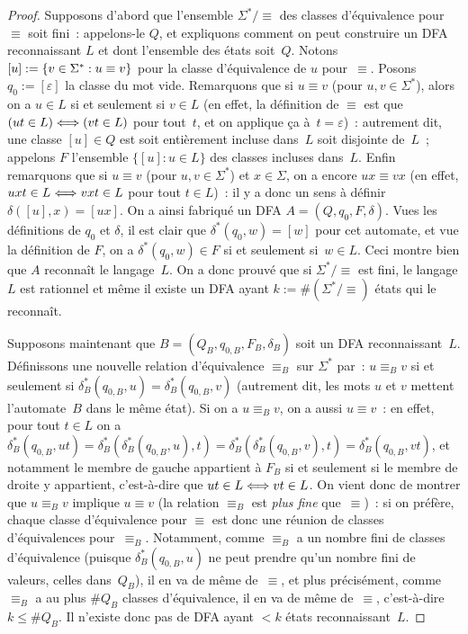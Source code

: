 \documentclass[12pt,a4paper]{article}
\theoremstyle{definition}
\newcommand{\liff}{\mathrel{\Longleftrightarrow}\relax}
\begin{document}
\begin{proof}
Supposons d'abord que l'ensemble $\Sigma^*/{\equiv}$ des classes
d'équivalence pour $\equiv$ soit fini : appelons-le $Q$, et expliquons
comment on peut construire un DFA reconnaissant $L$ et dont l'ensemble
des états soit $Q$.  Notons $[u] := \{v \in \Sigma^* :\penalty-100
u\equiv v\}$ pour la classe d'équivalence de $u$ pour $\equiv$.
Posons $q_0 := [\varepsilon]$ la classe du mot vide.  Remarquons que
si $u\equiv v$ (pour $u,v\in\Sigma^*$), alors on a $u\in L$ si et
seulement si $v\in L$ (en effet, la définition de $\equiv$ est que
$(ut\in L) \liff (vt \in L)$ pour tout $t$, et on applique ça
à $t=\varepsilon$) : autrement dit, une classe $[u] \in Q$ est soit
entièrement incluse dans $L$ soit disjointe de $L$ ; appelons $F$
l'ensemble $\{[u] : u\in L\}$ des classes incluses dans $L$.  Enfin
remarquons que si $u\equiv v$ (pour $u,v\in\Sigma^*$) et $x\in\Sigma$,
on a encore $ux \equiv vx$ (en effet, $uxt \in L \liff vxt \in L$ pour
tout $t\in L$) : il y a donc un sens à définir $\delta([u], x) =
[ux]$.  On a ainsi fabriqué un DFA $A = (Q,q_0,F,\delta)$.
Vues les définitions de $q_0$ et $\delta$, il est clair que
$\delta^*(q_0,w) = [w]$ pour cet automate, et vue la définition de
$F$, on a $\delta^*(q_0,w) \in F$ si et seulement si $w\in L$.  Ceci
montre bien que $A$ reconnaît le langage $L$.  On a donc prouvé que si
$\Sigma^*/{\equiv}$ est fini, le langage $L$ est rationnel et même il
existe un DFA ayant $k := \#(\Sigma^*/{\equiv})$ états qui le
reconnaît.

Supposons maintenant que $B = (Q_B, q_{0,B}, F_B, \delta_B)$ soit un
DFA reconnaissant $L$.  Définissons une nouvelle relation
d'équivalence $\mathrel{\equiv_B}$ sur $\Sigma^*$ par : $u
\mathrel{\equiv_B} v$ si et seulement si $\delta_B^*(q_{0,B}, u) =
\delta_B^*(q_{0,B}, v)$ (autrement dit, les mots $u$ et $v$ mettent
l'automate $B$ dans le même état).  Si on a $u \mathrel{\equiv_B} v$,
on a aussi $u \equiv v$ : en effet, pour tout $t\in L$ on a
$\delta_B^*(q_{0,B}, ut) = \delta_B^*(\delta_B^*(q_{0,B}, u), t) =
\delta_B^*(\delta_B^*(q_{0,B}, v), t) = \delta_B^*(q_{0,B}, vt)$, et
notamment le membre de gauche appartient à $F_B$ si et seulement si le
membre de droite y appartient, c'est-à-dire que $ut\in L \liff vt\in
L$.  On vient donc de montrer que $u \mathrel{\equiv_B} v$ implique $u
\equiv v$ (la relation $\equiv_B$ est \emph{plus fine} que $\equiv$) :
si on préfère, chaque classe d'équivalence pour $\equiv$ est donc une
réunion de classes d'équivalences pour $\equiv_B$.  Notamment, comme
$\equiv_B$ a un nombre fini de classes d'équivalence (puisque
$\delta_B^*(q_{0,B}, u)$ ne peut prendre qu'un nombre fini de valeurs,
celles dans $Q_B$), il en va de même de $\equiv$, et plus précisément,
comme $\equiv_B$ a au plus $\#Q_B$ classes d'équivalence, il en va de
même de $\equiv$, c'est-à-dire $k \leq \#Q_B$.  Il n'existe donc pas
de DFA ayant $<k$ états reconnaissant $L$.


\end{proof}
\end{document}
